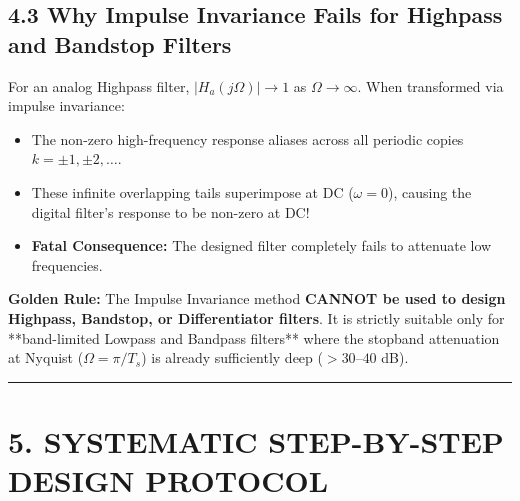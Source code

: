\documentclass[11pt,a4paper]{article}
\begin{document}
\subsection{4.3 Why Impulse Invariance Fails for Highpass and Bandstop Filters}
For an analog Highpass filter, $|H_a(j\Omega)| \to 1$ as $\Omega \to \infty$. 
When transformed via impulse invariance:
\begin{itemize}
    \item The non-zero high-frequency response aliases across all periodic copies $k = \pm 1, \pm 2, \dots$.
    \item These infinite overlapping tails superimpose at DC ($\omega = 0$), causing the digital filter's response to be non-zero at DC!
    \item \textbf{Fatal Consequence:} The designed filter completely fails to attenuate low frequencies.
\end{itemize}
\textbf{Golden Rule:} The Impulse Invariance method \textbf{CANNOT be used to design Highpass, Bandstop, or Differentiator filters}. It is strictly suitable only for **band-limited Lowpass and Bandpass filters** where the stopband attenuation at Nyquist ($\Omega = \pi/T_s$) is already sufficiently deep ($> 30\text{--}40$ dB).

\noindent\rule{\textwidth}{0.5pt}

\section{5. SYSTEMATIC STEP-BY-STEP DESIGN PROTOCOL}
\end{document}
